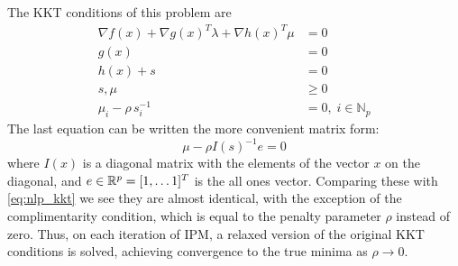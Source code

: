 \documentclass[../root.tex]{subfiles}
\begin{document}
    The KKT conditions of this problem are 
    \begin{subequations}
        \begin{align}
            \nabla f(x) + \nabla g(x)^T \lambda + \nabla h(x)^T \mu &= 0\\
            g(x) &= 0 \\
            h(x) + s &= 0 \\
            s, \mu &\geq 0 \\
            \mu_i - \rho \, s_i^{-1} &= 0, \; i \in \mathbb{N}_p 
        \end{align}
    \end{subequations}
    The last equation can be written the more convenient matrix form:
    \begin{equation} \label{eq:ipm_complimentarity}
        \mu - \rho I(s)^{-1} e = 0
    \end{equation}
    where $I(x)$ is a diagonal matrix with the elements of the vector $x$ on the
    diagonal, and $e \in \mathbb{R}^p = [1, \dots 1]^T$ is the all ones vector. Comparing
    these with \eqref{eq:nlp_kkt} we see they are almost identical, with the exception
    of the complimentarity condition, which is equal to the penalty parameter
    $\rho$ instead of zero. Thus, on each iteration of IPM, a relaxed version of
    the original KKT conditions is solved, achieving convergence to the true
    minima as $\rho \rightarrow 0$.
\end{document}
